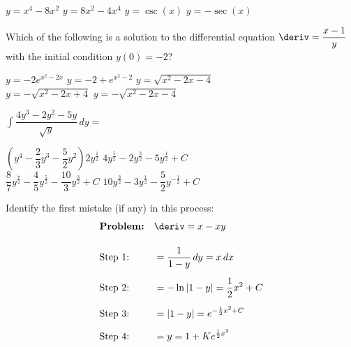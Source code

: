 \begin{questions}
    \begin{oneparchoices}
        \choice $y = x^4 - 8x^2$
        \choice $y = 8x^2 - 4x^4$
        \choice $y = \csc (x)$
        \choice $y = -\sec (x)$
    \end{oneparchoices} \par \horizontalline

    \question Which of the following is a solution to the differential equation $\deriv = \dfrac{x - 1}{y}$ with the initial condition $y(0) = -2$? \\
    
    \begin{oneparchoices}
        \choice $y  = -2e^{x^2 - 2x}$
        \choice $y = -2 + e^{x^2 - 2}$
        \choice $y = \sqrt{x^2 - 2x - 4}$ \\[11pt]
        \makebox[0.17\textwidth] \choice $y = -\sqrt{x^2 - 2x + 4}$
        \makebox[0.2\textwidth] \choice $y = -\sqrt{x^2 - 2x - 4}$
    \end{oneparchoices} \par \horizontalline

    \question $\int \dfrac{4y^3 - 2y^2 - 5y}{\sqrt{y}} \, dy = $ \\

    \begin{oneparchoices}
        \choice $\left(y^4 - \dfrac{2}{3}y^3 - \dfrac{5}{2}y^2\right)2y^{\frac{1}{2}}$ 
        \makebox[0.3\textwidth] \choice $4y^{\frac{5}{2}} - 2y^{\frac{3}{2}} - 5y^{\frac{1}{2}} + C$ \\[11pt]
        \makebox[0.035\textwidth] \choice $\dfrac{8}{7}y^{\frac{7}{2}} - \dfrac{4}{5}y^{\frac{5}{2}} - \dfrac{10}{3}y^{\frac{3}{2}} + C$
        \makebox[0.285\textwidth] \choice $10y^{\frac{3}{2}} - 3y^{\frac{1}{2}} - \dfrac{5}{2}y^{-\frac{1}{2}} + C$
    \end{oneparchoices} \par \horizontalline

    \question Identify the first mistake (if any) in this process: \begin{align*}
        & \textbf{Problem:} && \deriv = x - xy\\[11pt]
        & \text{Step 1:} && = \dfrac{1}{1 - y} \, dy = x \, dx \\[5.5pt]
        & \text{Step 2:} && = -\ln |1 - y| = \dfrac{1}{2}x^2 + C \\[5.5pt]
        & \text{Step 3:} && = |1 - y| = e^{-\frac{1}{2}x^2 + C} \\[5.5pt]
        & \text{Step 4:} && = y = 1 + Ke^{\frac{1}{2}x^2}
    \end{align*}


\end{questions}
